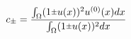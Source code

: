 \documentclass[11pt]{article}
\newcommand{\rpm}{\raisebox{.2ex}{$\scriptstyle\pm$}}
\begin{document}
	\begin{align}
		c_{\rpm} = \frac{\int_\Omega (1 \rpm u(x))^2 u^{(0)}(x) dx}{\int_\Omega (1 \rpm u(x))^2 dx}
	\end{align}
\end{document}
